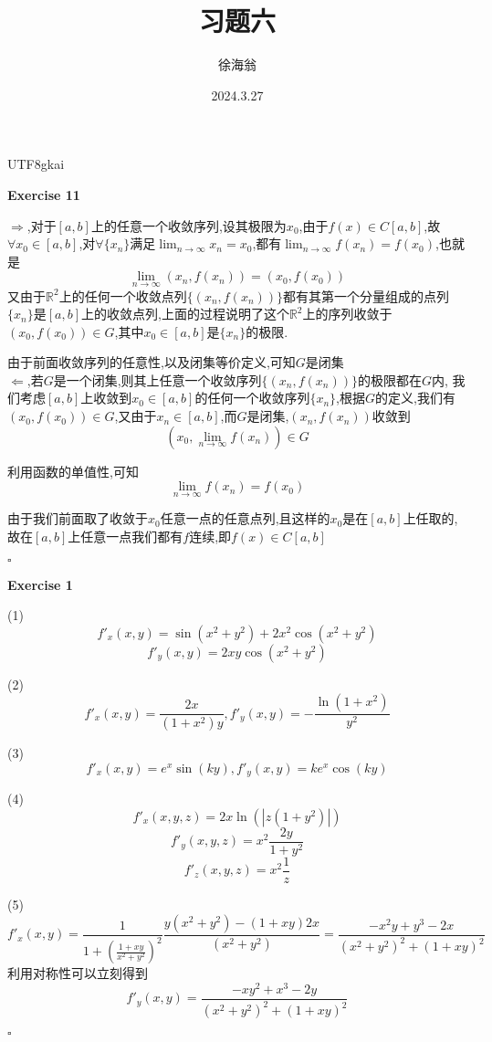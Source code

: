 \documentclass{article}
\title{习题六}
\author{徐海翁}
\date{2024.3.27}
\newenvironment{exercise}[1]{%
{\textbf{Exercise #1} \\ 
    }
}{
  \hfill $\square$ 
  \par\bigskip 
}
\newcommand{\RR}{\mathbb{R}}
\begin{document}
\begin{CJK}{UTF8}{gkai}

\maketitle
\tableofcontents


\begin{exercise}{11}
    $\Rightarrow$,对于$[a,b]$上的任意一个收敛序列,设其极限为$x_0$,由于$f(x)\in C[a,b]$,故$\forall x_0 \in [a,b]$,对$\forall \{x_n\}$满足$\lim_{n \to \infty} x_n = x_0$,都有$\lim_{n\to \infty} f(x_n) = f(x_0)$,也就是
    \[\lim_{n\to \infty} (x_n,f(x_n)) = (x_0,f(x_0))\]
    又由于$\RR^2$上的任何一个收敛点列$\{(x_n,f(x_n))\}$都有其第一个分量组成的点列$\{x_n\}$是$[a,b]$上的收敛点列,上面的过程说明了这个$\RR^2$上的序列收敛于$(x_0,f(x_0)) \in G$,其中$x_0 \in [a,b]$是$\{x_n\}$的极限.
    
    由于前面收敛序列的任意性,以及闭集等价定义,可知$G$是闭集\\

    $\Leftarrow$,若$G$是一个闭集,则其上任意一个收敛序列$\{(x_n,f(x_n))\}$的极限都在$G$内,
    我们考虑$[a,b]$上收敛到$x_0 \in [a,b]$的任何一个收敛序列$\{x_n\}$,根据$G$的定义,我们有$(x_0,f(x_0)) \in G$,又由于$x_n \in [a,b]$,而$G$是闭集,$(x_n,f(x_n))$收敛到
    \[(x_0,\lim_{n\to \infty}f(x_n)) \in G\]
    
    利用函数的单值性,可知
    \[\lim_{n\to \infty}f(x_n) = f(x_0)\]

    由于我们前面取了收敛于$x_0$任意一点的任意点列,且这样的$x_0$是在$[a,b]$上任取的,故在$[a,b]$上任意一点我们都有$f$连续,即$f(x)\in C[a,b]$
\end{exercise}

\begin{exercise}{1}
    (1)
    \[f'_x(x,y) = \sin(x^2 + y^2) + 2x^2 \cos(x^2 + y^2)\]
    \[f'_y(x,y) = 2xy\cos(x^2 + y^2)\]

    (2)
    \[f'_x(x,y) = \frac{2x}{(1 + x^2)y},f'_y(x,y) = -\frac{\ln(1 + x^2)}{y^2}\]

    (3)
    \[f'_x(x,y) = e^x \sin(ky),f'_y(x,y) = k e^x \cos (ky)\]

    (4)
    \[f'_x(x,y,z) = 2x \ln(|z(1 + y^2)|)\]
    \[f'_y(x,y,z) = x^2 \frac{2y}{1 + y^2}\]
    \[f'_z(x,y,z) = x^2 \frac{1}{z}\]

    (5)
    \[f'_x(x,y) = \frac{1}{1 + (\frac{1 + xy}{x^2 + y^2})^2} \frac{y(x^2 + y^2) - (1 + xy) 2x}{(x^2 + y^2)} = \frac{-x^2y + y^3 - 2x}{(x^2 + y^2)^2 + (1 + xy)^2}\]
    利用对称性可以立刻得到
    \[f'_y(x,y) = \frac{-xy^2 + x^3 - 2y}{(x^2 + y^2)^2 + (1 + xy)^2}\]
\end{exercise}


\end{CJK}
\end{document}

